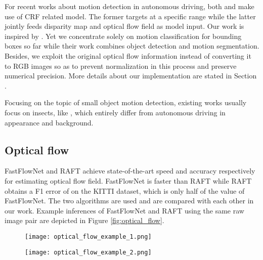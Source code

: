 \documentclass[10pt, a4paper, twocolumn]{article}
\begin{document}
    For recent works about motion detection in autonomous driving, both  \cite{9443120} and \cite{8076832} make use of CRF related model. The former targets at a specific range while the latter jointly feeds disparity map and optical flow field as model input. Our work is inspired by \cite{8569744}. Yet we concentrate solely on motion classification for bounding boxes so far while their work combines object detection and motion segmentation. Besides, we exploit the original optical flow information instead of converting it to RGB images so as to prevent normalization in this process and preserve numerical precision. More details about our implementation are stated in Section .
    
    Focusing on the topic of small object motion detection, existing works usually focus on insects, like \cite{DBLP:journals/corr/abs-1805-00342}\cite{rs13040653}, which entirely differ from autonomous driving in appearance and background.

\subsection{\normalsize Optical flow}

    FastFlowNet \cite{Kong:2021:FastFlowNet} and RAFT \cite{DBLP:journals/corr/abs-2003-12039} achieve state-of-the-art speed and accuracy respectively for estimating optical flow field. FastFlowNet is  faster than RAFT while RAFT obtains a F1 error of  on the KITTI \cite{Geiger2013IJRR} dataset, which is only half of the value of FastFlowNet. The two algorithms are used and are compared with each other in our work. Example inferences of FastFlowNet and RAFT using the same raw image pair are depicted in Figure \ref{fig:optical_flow}.

    \begin{figure*}[t!]
        \centering
        \begin{subfigure}{.8\textwidth}
            \centering
            \texttt{[image: optical\_flow\_example\_1.png]}
        \end{subfigure}
        \par\smallskip
        \begin{subfigure}{.8\textwidth}
        \centering
        \texttt{[image: optical\_flow\_example\_2.png]}
        \end{subfigure}
    \caption{Examples of optical flow predictions on the nuScenes dataset. From left to right: the preceding raw image of a keyframe pairs, flow visualization of FastFlowNet and RAFT.}
    \label{fig:optical_flow}
    \end{figure*}
    
\end{document}
